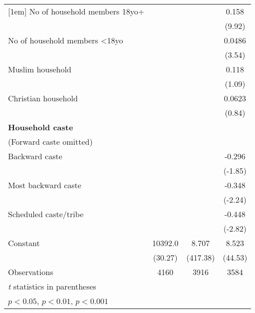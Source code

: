 {\begin{tabular}{l*{3}{c}}
[1em]
No of household members 18yo+&                     &                     &       0.158\sym{***}\\
                    &                     &                     &      (9.92)         \\
[1em]
No of household members \textless{}18yo&                     &                     &      0.0486\sym{***}\\
                    &                     &                     &      (3.54)         \\
[1em]
Muslim household    &                     &                     &       0.118         \\
                    &                     &                     &      (1.09)         \\
[1em]
Christian household &                     &                     &      0.0623         \\
                    &                     &                     &      (0.84)         \\
[1em]
\textbf{Household caste} \\ (Forward caste omitted)&                     &                     &                     \\
[1em]
Backward caste      &                     &                     &      -0.296         \\
                    &                     &                     &     (-1.85)         \\
[1em]
Most backward caste &                     &                     &      -0.348\sym{*}  \\
                    &                     &                     &     (-2.24)         \\
[1em]
Scheduled caste/tribe&                     &                     &      -0.448\sym{**} \\
                    &                     &                     &     (-2.82)         \\
[1em]
Constant            &     10392.0\sym{***}&       8.707\sym{***}&       8.523\sym{***}\\
                    &     (30.27)         &    (417.38)         &     (44.53)         \\
\hline
Observations        &        4160         &        3916         &        3584         \\
\hline\hline
\multicolumn{4}{l}{\footnotesize \textit{t} statistics in parentheses}\\
\multicolumn{4}{l}{\footnotesize \sym{*} \(p<0.05\), \sym{**} \(p<0.01\), \sym{***} \(p<0.001\)}\\
\end{tabular}
}
